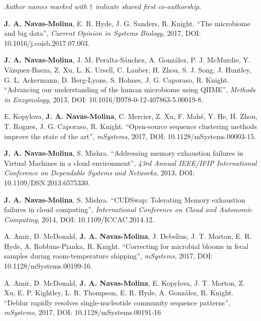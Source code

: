 \begin{frontmatter}
\begin{vitapage}
\begin{publications}

    \item \textsl{Author names marked with $\dagger$ indicate shared first co-authorship}.

    \item \textbf{J. A. Navas-Molina}, E. R. Hyde, J. G. Sanders, R. Knight. ``The microbiome and big data'', \emph{Current Opinion in Systems Biology}, 2017, DOI: 10.1016/j.coisb.2017.07.003.

	\item \textbf{J. A. Navas-Molina}, J. M. Peralta-S\'anchez, A. Gonz\'alez, P. J. McMurdie, Y. V\'azquez-Baeza, Z. Xu, L. K. Ursell, C. Lauber, H. Zhou, S. J. Song, J. Huntley, G. L. Ackermann, D. Berg-Lyons, S. Holmes, J. G. Caporaso, R. Knight. ``Advancing our understanding of the human microbiome using QIIME'', \emph{Methods in Enzymology}, 2013, DOI: 10.1016/B978-0-12-407863-5.00019-8.

	\item E. Kopylova, \textbf{J. A. Navas-Molina}, C. Mercier, Z. Xu, F. Mah\'e, Y. He, H. Zhou, T. Rognes, J. G. Caporaso, R. Knight. ``Open-source sequence clustering methods improve the state of the art'', \emph{mSystems}, 2017, DOI: 10.1128/mSystems.00003-15.

	\item \textbf{J. A. Navas-Molina}, S. Mishra. ``Addressing memory exhaustion failures in Virtual Machines in a cloud environment'', \emph{43rd Annual IEEE/IFIP International Conference on Dependable Systems and Networks}, 2013, DOI: 10.1109/DSN.2013.6575330.

	\item \textbf{J. A. Navas-Molina}, S. Mishra. ``CUDSwap: Tolerating Memory exhaustion failures in cloud computing'', \emph{International Conference on Cloud and Autonomic Computing}, 2014, DOI: 10.1109/ICCAC.2014.12.

	\item A. Amir, D. McDonald, \textbf{J. A. Navas-Molina}, J. Debelius, J. T. Morton, E. R. Hyde, A. Robbins-Pianka, R. Knight. ``Correcting for microbial blooms in fecal samples during room-temperature shipping'', \emph{mSystems}, 2017, DOI: 10.1128/mSystems.00199-16.

	\item A. Amir, D. McDonald, \textbf{J. A. Navas-Molina}, E. Kopylova, J. T. Morton, Z. Xu, E. P. Kightley, L. R. Thompson, E. R. Hyde, A. Gonz\'alez, R. Knight. ``Deblur rapidly resolves single-nucleotide community sequence patterns'', \emph{mSystems}, 2017, DOI: 10.1128/mSystems.00191-16


\end{publications}
\end{vitapage}
\end{frontmatter}
